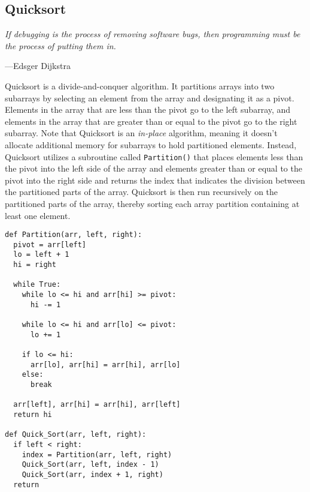 \documentclass[11pt]{article}
\begin{document}
\subsection{Quicksort}
\epigraph{\emph{If debugging is the process of removing software bugs, then
programming must be the process of putting them in.}}{---Edsger Dijkstra}



\noindent Quicksort is a divide-and-conquer algorithm. It partitions arrays
into two subarrays by selecting an element from the array and designating it as
a pivot.  Elements in the array that are less than the pivot go to the left
subarray, and elements in the array that are greater than or equal to the pivot
go to the right subarray. Note that Quicksort is an \emph{in-place} algorithm,
meaning it doesn't allocate additional memory for subarrays to hold partitioned
elements. Instead, Quicksort utilizes a subroutine called \texttt{Partition()}
that places elements less than the pivot into the left side of the array and
elements greater than or equal to the pivot into the right side and returns the
index that indicates the division between the partitioned parts of the array.
Quicksort is then run recursively on the partitioned parts of the array, thereby
sorting each array partition containing at least one element.

\begin{lstlisting}[title=Quicksort (pseudocode)]
def Partition(arr, left, right):
  pivot = arr[left]
  lo = left + 1
  hi = right

  while True:
    while lo <= hi and arr[hi] >= pivot:
      hi -= 1

    while lo <= hi and arr[lo] <= pivot:
      lo += 1

    if lo <= hi:
      arr[lo], arr[hi] = arr[hi], arr[lo]
    else:
      break

  arr[left], arr[hi] = arr[hi], arr[left]
  return hi

def Quick_Sort(arr, left, right):
  if left < right:
    index = Partition(arr, left, right)
    Quick_Sort(arr, left, index - 1)
    Quick_Sort(arr, index + 1, right)
  return
\end{lstlisting}
\end{document}
